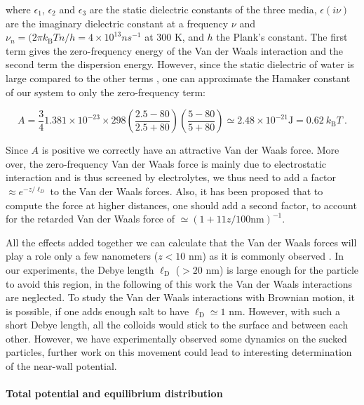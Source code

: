where $\epsilon_1$, $\epsilon_2$ and $\epsilon_3$ are the static dielectric constants of the three media, $\epsilon (i\nu)$ are the imaginary dielectric constant at a frequency $\nu$ and $\nu_n = (2 \pi k_\mathrm{B}Tn/h = 4 \times 10^{13} n s^{-1}$ at $300$ K, and $h$ the Plank's constant. The first term gives the zero-frequency energy of the Van der Waals interaction and the second term the dispersion energy.
However, since the static dielectric of water is large compared to the other terms \cite{israelachvili_intermolecular_2015}, one can approximate the Hamaker constant of our system to only the zero-frequency term:

\begin{equation}
	A = \frac{3}{4} 1.381 \times 10^{-23} \times 298 
	\left(
	\frac{2.5 - 80}{2.5 + 80}
	\right)
	\left(
	\frac{5 - 80}{5 + 80}
	\right)
	\simeq
	2.48 \times 10^{-21} \mathrm{J} = 0.62 ~ k_\mathrm{B}T ~.
\end{equation}

Since $A$ is positive we correctly have an attractive Van der Waals force. More over, the zero-frequency Van der Waals force is mainly due to electrostatic interaction and is thus screened by electrolytes, we thus need to add a factor $\approx e^{-z/\ell_D}$ to the Van der Waals forces. Also, it has been proposed \cite{gregory_approximate_1981} that to compute the force at higher distances, one should add a second factor, to account for the retarded Van der Waals force of $ \simeq (1  + 11z/100 \mathrm{nm})^{-1}$. 


All the effects added together we can calculate that the Van der Waals forces will play a role only a few nanometers ($z < 10$ nm) as it is commonly observed \cite{prieve_measurement_1999}. In our experiments, the Debye length $\ell _\mathrm{D}$ ($>20$ nm) is large enough for the particle to avoid this region, in the following of this work the Van der Waals interactions are neglected. To study the Van der Waals interactions with Brownian motion, it is possible, if one adds enough salt to have $\ell_\mathrm{D} \simeq 1$ nm. However, with such a short Debye length, all the colloids would stick to the surface and between each other. However, we have experimentally observed some dynamics on the sucked particles, further work on this movement could lead to interesting determination of the near-wall potential. 

\newpage

\paragraph{Total potential and equilibrium distribution}\mbox{}\\
\label{test}
\vspace{0.10cm}

